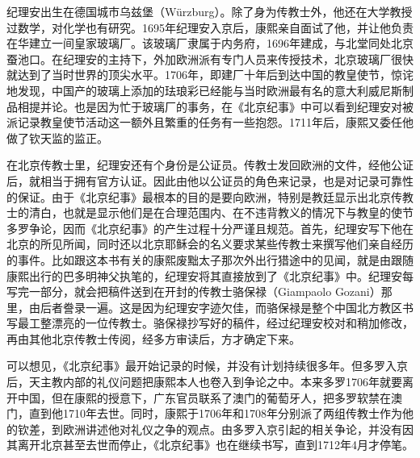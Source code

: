 
纪理安出生在德国城市乌兹堡（Würzburg）。除了身为传教士外，他还在大学教授过数学，对化学也有研究。1695年纪理安入京后，康熙亲自面试了他，并让他负责在华建立一间皇家玻璃厂。该玻璃厂隶属于内务府，1696年建成，与北堂同处北京蚕池口。在纪理安的主持下，外加欧洲派有专门人员来传授技术，北京玻璃厂很快就达到了当时世界的顶尖水平。1706年，即建厂十年后到达中国的教皇使节，惊诧地发现，中国产的玻璃上添加的珐琅彩已经能与当时欧洲最有名的意大利威尼斯制品相提并论。也是因为忙于玻璃厂的事务，在《北京纪事》中可以看到纪理安对被派记录教皇使节活动这一额外且繁重的任务有一些抱怨。1711年后，康熙又委任他做了钦天监的监正。



在北京传教士里，纪理安还有个身份是公证员。传教士发回欧洲的文件，经他公证后，就相当于拥有官方认证。因此由他以公证员的角色来记录，也是对记录可靠性的保证。由于《北京纪事》最根本的目的是要向欧洲，特别是教廷显示出北京传教士的清白，也就是显示他们是在合理范围内、在不违背教义的情况下与教皇的使节多罗争论，因而《北京纪事》的产生过程十分严谨且规范。首先，纪理安写下他在北京的所见所闻，同时还以北京耶稣会的名义要求某些传教士来撰写他们亲自经历的事件。比如跟这本书有关的康熙废黜太子那次外出行猎途中的见闻，就是由跟随康熙出行的巴多明神父执笔的，纪理安将其直接放到了《北京纪事》中。纪理安每写完一部分，就会把稿件送到在开封的传教士骆保禄（Giampaolo Gozani）那里，由后者誊录一遍。这是因为纪理安字迹欠佳，而骆保禄是整个中国北方教区书写最工整漂亮的一位传教士。骆保禄抄写好的稿件，经过纪理安校对和稍加修改，再由其他北京传教士传阅，经多方审读后，方才确定下来。



可以想见，《北京纪事》最开始记录的时候，并没有计划持续很多年。但多罗入京后，天主教内部的礼仪问题把康熙本人也卷入到争论之中。本来多罗1706年就要离开中国，但在康熙的授意下，广东官员联系了澳门的葡萄牙人，把多罗软禁在澳门，直到他1710年去世。同时，康熙于1706年和1708年分别派了两组传教士作为他的钦差，到欧洲讲述他对礼仪之争的观点。由多罗入京引起的相关争论，并没有因其离开北京甚至去世而停止，《北京纪事》也在继续书写，直到1712年4月才停笔。


